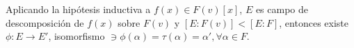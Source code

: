 \begin{teorema}
\begin{dem}
\begin{enumerate}
            Aplicando la hipótesis inductiva a $f(x)\in F(v)[x]$, $E$ es campo de descomposición de $f(x)$ sobre $F(v)$ y $[E:F(v)]<[E:F]$, entonces existe $\phi:E\to E'$, isomorfismo $\ni\phi(\alpha)=\tau(\alpha)=\alpha',\forall\alpha \in F$. 
        \end{enumerate}
    \end{dem}
\end{teorema}